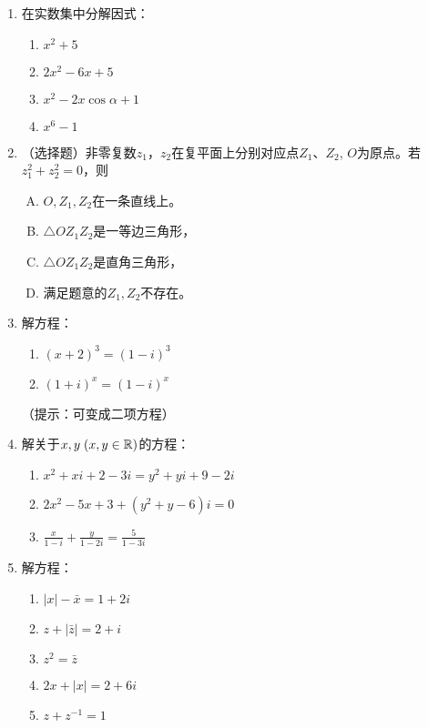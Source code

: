 \begin{enumerate}
\item 在实数集中分解因式：
\begin{multicols}{2}
\begin{enumerate}[(1)]
    \item $x^2+5$
    \item $2x^2-6x+5$
    \item $x^2-2x\cos\alpha+1$
    \item $x^6-1$
\end{enumerate}
\end{multicols}

\item （选择题）非零复数$z_1$，$z_2$在复平面上分别对应点$Z_1$、$Z_2$,
$O$为原点。若$z_1^2+z_2^2=0$，则
\begin{multicols}{2}
\begin{enumerate}[(A)]
\item $O,Z_1,Z_2$在一条直线上。
\item $\triangle OZ_1Z_2$是一等边三角形，
\item $\triangle OZ_1Z_2$是直角三角形，
\item 满足题意的$Z_1,Z_2$不存在。
\end{enumerate}
\end{multicols}

\item 解方程：
\begin{multicols}{2}
\begin{enumerate}[(1)]
    \item $(x+2)^3=(1-i)^3$
\item $(1+i)^x=(1-i)^x$
\end{enumerate}
\end{multicols}
（提示：可变成二项方程）
\item 解关于$x,y\; (x,y\in\mathbb{R})$的方程：
\begin{enumerate}[(1)]
    \item $x^2+xi+2-3i=y^2+yi+9-2i$
 \item    $2x^2-5x+3+(y^2+y-6)i=0$
 \item   $\frac{x}{1-i}+\frac{y}{1-2i}=\frac{5}{1-3i}$
\end{enumerate}
\item 解方程：
\begin{multicols}{2}
\begin{enumerate}[(1)]
    \item $|x|-\bar x=1+2i$
    \item $z+|\bar z|=2+i$
    \item $z^2=\bar z$
    \item $2x+|x|=2+6i$
    \item $z+z^{-1}=1$
\end{enumerate}
\end{multicols}
\end{enumerate}

